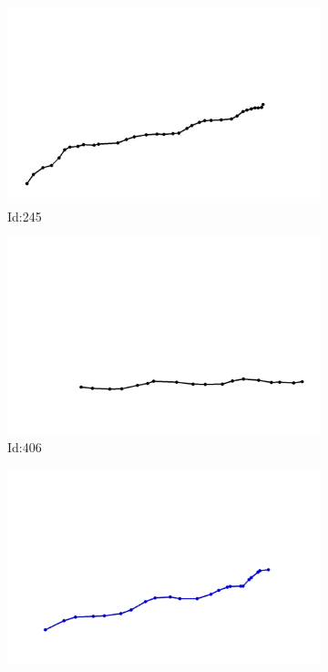 \documentclass[12pt,twoside]{report}
\begin{document}
\begin{figure}
\centering
\begin{subfigure}[b]{0.20\textwidth}
\centering
\includegraphics[width=\textwidth]{../../trajectories/245.png}
\caption{Id:245}
\end{subfigure}
\begin{subfigure}[b]{0.20\textwidth}
\centering
\includegraphics[width=\textwidth]{../../trajectories/406.png}
\caption{Id:406}
\end{subfigure}
\begin{subfigure}[b]{0.20\textwidth}
\centering
\includegraphics[width=\textwidth]{../../trajectories/438.png}

\end{subfigure}
\end{figure}
\end{document}
